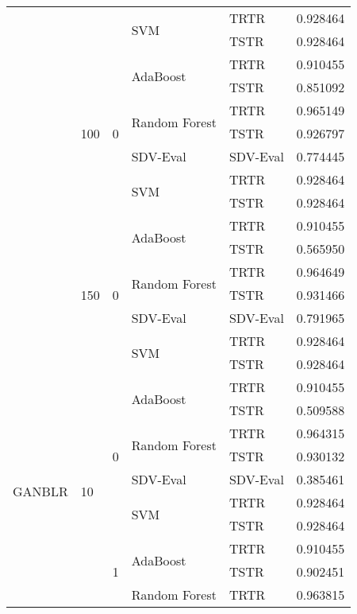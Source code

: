 \begin{longtable}{lllllr}
\cline{4-6}
 &  &  & \multirow[t]{2}{*}{SVM} & TRTR & 0.928464 \\
 &  &  &  & TSTR & 0.928464 \\
\cline{2-6} \cline{3-6} \cline{4-6}
 & \multirow[t]{7}{*}{100} & \multirow[t]{7}{*}{0} & \multirow[t]{2}{*}{AdaBoost} & TRTR & 0.910455 \\
 &  &  &  & TSTR & 0.851092 \\
\cline{4-6}
 &  &  & \multirow[t]{2}{*}{Random Forest} & TRTR & 0.965149 \\
 &  &  &  & TSTR & 0.926797 \\
\cline{4-6}
 &  &  & SDV-Eval & SDV-Eval & 0.774445 \\
\cline{4-6}
 &  &  & \multirow[t]{2}{*}{SVM} & TRTR & 0.928464 \\
 &  &  &  & TSTR & 0.928464 \\
\cline{2-6} \cline{3-6} \cline{4-6}
 & \multirow[t]{7}{*}{150} & \multirow[t]{7}{*}{0} & \multirow[t]{2}{*}{AdaBoost} & TRTR & 0.910455 \\
 &  &  &  & TSTR & 0.565950 \\
\cline{4-6}
 &  &  & \multirow[t]{2}{*}{Random Forest} & TRTR & 0.964649 \\
 &  &  &  & TSTR & 0.931466 \\
\cline{4-6}
 &  &  & SDV-Eval & SDV-Eval & 0.791965 \\
\cline{4-6}
 &  &  & \multirow[t]{2}{*}{SVM} & TRTR & 0.928464 \\
 &  &  &  & TSTR & 0.928464 \\
\cline{1-6} \cline{2-6} \cline{3-6} \cline{4-6}
\multirow[t]{70}{*}{GANBLR} & \multirow[t]{14}{*}{10} & \multirow[t]{7}{*}{0} & \multirow[t]{2}{*}{AdaBoost} & TRTR & 0.910455 \\
 &  &  &  & TSTR & 0.509588 \\
\cline{4-6}
 &  &  & \multirow[t]{2}{*}{Random Forest} & TRTR & 0.964315 \\
 &  &  &  & TSTR & 0.930132 \\
\cline{4-6}
 &  &  & SDV-Eval & SDV-Eval & 0.385461 \\
\cline{4-6}
 &  &  & \multirow[t]{2}{*}{SVM} & TRTR & 0.928464 \\
 &  &  &  & TSTR & 0.928464 \\
\cline{3-6} \cline{4-6}
 &  & \multirow[t]{7}{*}{1} & \multirow[t]{2}{*}{AdaBoost} & TRTR & 0.910455 \\
 &  &  &  & TSTR & 0.902451 \\
\cline{4-6}
 &  &  & \multirow[t]{2}{*}{Random Forest} & TRTR & 0.963815 \\

\end{longtable}
